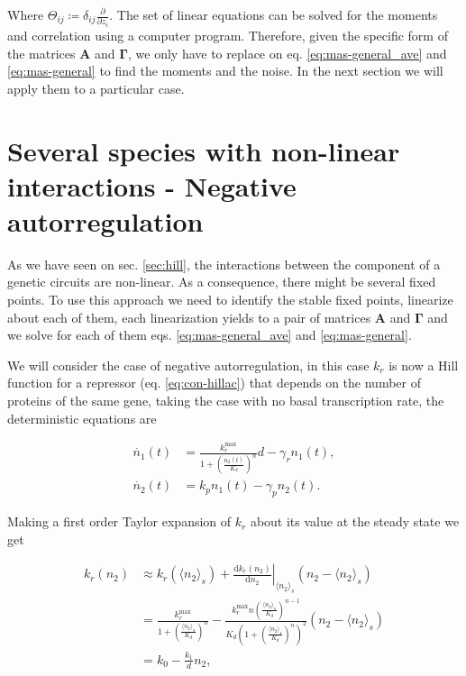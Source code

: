 
Where $\Theta_{ij} \coloneqq \delta_{ij}\frac{\partial}{\partial z_i}$. The set of linear equations can be solved for the moments and correlation using a computer program. Therefore, given the specific form of the matrices $\mathbf{A}$ and $\mathbf{\Gamma}$, we only have to replace on eq. \eqref{eq:mas-general_ave} and \eqref{eq:mas-general} to find the moments and the noise. In the next section we will apply them to a particular case.

\section{Several species with non-linear interactions - Negative autorregulation}
\label{sec:mas-neg_autorreg}

As we have seen on sec. \ref{sec:hill}, the interactions between the component of a genetic circuits are non-linear. As a consequence, there might be several fixed points. To use this approach we need to identify the stable fixed points, linearize about each of them, each linearization yields to a pair of matrices $\mathbf{A}$ and $\mathbf{\Gamma}$ and we solve for each of them eqs. \eqref{eq:mas-general_ave} and \eqref{eq:mas-general}.

We will consider the case of negative autorregulation, in this case $k_r$ is now a Hill function for a repressor (eq. \eqref{eq:con-hillac}) that depends on the number of proteins of the same gene, taking the case with no basal transcription rate, the deterministic equations are

\begin{align*}
  \dot{n_1}(t) &= \frac{k_r^{\text{max}}}{1+\left(\frac{n_2(t)}{K_d}\right)^n}d - \gamma_rn_1(t),\\
  \dot{n_2}(t) &= k_pn_1(t)-\gamma_pn_2(t).
\end{align*}


Making a first order Taylor expansion of $k_r$ about its value at the steady state we get


\begin{equation}
  \begin{split}
  k_r(n_2) &\approx k_r(\langle n_2\rangle_s) + \left.\frac{\mathrm{d}k_r(n_2)}{\mathrm{d}n_2}\right|_{\langle n_2\rangle_s}\left(n_2-\langle n_2\rangle_s\right)\\
  &=\frac{k_r^{\text{max}}}{1+\left(\frac{\langle n_2\rangle_s}{K_d}\right)^n} - \frac{k_r^{\text{max}}n\left(\frac{\langle n_2\rangle_s}{K_d}\right)^{n-1}}{K_d\left(1+\left(\frac{\langle n_2\rangle_s}{K_d}\right)^n\right)^2}\left(n_2-\langle n_2\rangle_s\right)\\
  &= k_0-\frac{k_1}{d}n_2,
  \end{split}
\end{equation} 


